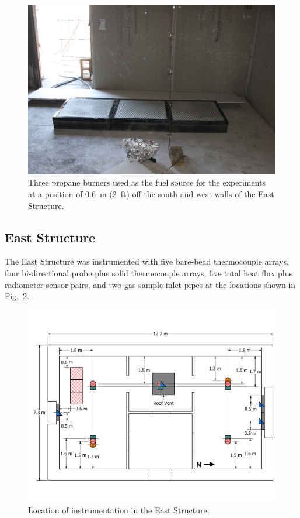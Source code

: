 \documentclass[12pt,oneside]{book}
\begin{document}
\begin{figure}[!ht]
	\includegraphics[width=0.9\columnwidth]{../Figures/Pictures/burners}
	\caption[Three propane burners.]{Three propane burners used as the fuel source for the experiments at a position of 0.6~m (2~ft) off the south and west walls of the East Structure.}
	\label{fig:burners}
\end{figure}

\FloatBarrier

\subsection{East Structure}
The East Structure was instrumented with five bare-bead thermocouple arrays, four bi-directional probe plus solid thermocouple arrays, five total heat flux plus radiometer sensor pairs, and two gas sample inlet pipes at the locations shown in Fig.~\ref{fig:east_instrumentation}.

\begin{figure}[!ht]
	\includegraphics[width=\columnwidth]{../Figures/Floor_Plans/East_Structure_Dimensioned_Instrumentation}
	\caption{Location of instrumentation in the East Structure.}
	\label{fig:east_instrumentation}
\end{figure}
\FloatBarrier
\end{document}
